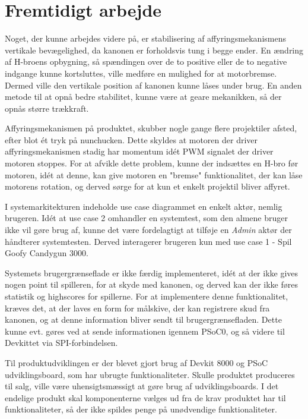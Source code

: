 \chapter{Fremtidigt arbejde}


Noget, der kunne arbejdes videre på, er stabilisering af affyringsmekanismens vertikale bevægelighed, da kanonen er forholdsvis tung i begge ender. En ændring af H-broens opbygning, så spændingen over de to positive eller de to negative indgange kunne kortsluttes, ville medføre en mulighed for at motorbremse. Dermed ville den vertikale position af kanonen kunne låses under brug. En anden metode til at opnå bedre stabilitet, kunne være at geare mekanikken, så der opnås større trækkraft.\newline

\noindent Affyringsmekanismen på produktet, skubber nogle gange flere projektiler afsted, efter blot ét tryk på nunchucken. Dette skyldes at motoren der driver affyringsmekanismen stadig har momentum idét PWM signalet der driver motoren stoppes. For at afvikle dette problem, kunne der indsættes en H-bro før motoren, idét at denne, kan give motoren en "bremse" funktionalitet, der kan låse motorens rotation, og derved sørge for at kun et enkelt projektil bliver affyret. \newline 

\noindent I systemarkitekturen indeholde use case diagrammet en enkelt aktør, nemlig brugeren. Idét at use case 2 omhandler en systemtest, som den almene bruger ikke vil gøre brug af, kunne det være fordelagtigt at tilføje en \textit{Admin} aktør der håndterer systemtesten. Derved interagerer brugeren kun med use case 1 - Spil Goofy Candygun 3000. \newline

\noindent Systemets brugergrænseflade er ikke færdig implementeret, idét at der ikke gives nogen point til spilleren, for at skyde med kanonen, og derved kan der ikke føres statistik og highscores for spillerne. For at implementere denne funktionalitet, kræves det, at der laves en form for målskive, der kan registrere skud fra kanonen, og at denne information bliver sendt til brugergrænsefladen. Dette kunne evt. gøres ved at sende informationen igennem PSoC0, og så videre til Devkittet via SPI-forbindelsen. \newline

\noindent Til produktudviklingen er der blevet gjort brug af Devkit 8000 og PSoC udviklingsboard, som har ubrugte funktionaliteter. Skulle produktet produceres til salg, ville være uhensigtsmæssigt at gøre brug af udviklingsboards. I det endelige produkt skal komponenterne vælges ud fra de krav produktet har til funktionaliteter, så der ikke spildes penge på unødvendige funktionaliteter.